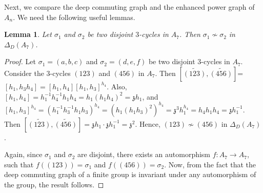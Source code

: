 \documentclass[12pt,a4paper]{article}
\newtheorem{lemma}[theorem]{Lemma}
\begin{document}
Next, we compare the deep commuting graph and the enhanced power graph of $A_n$. We need the following useful lemmas.
\begin{lemma}\label{3-cycle A_7}
Let $\sigma_1$ and $\sigma_2$ be two disjoint $3$-cycles in $A_7$. Then $\sigma_1\nsim\sigma_2$ in $\Delta_D(A_7)$.    
\end{lemma}
\begin{proof}
Let $\sigma_1=(a,b,c)$ and $\sigma_2=(d,e,f)$ be two disjoint $3$-cycles in $A_7$. Consider the $3$-cycles $(123)$ and $(456)$ in $A_7$. Then $[\tilde{(123)},\tilde{(456)}]$=$[h_1,h_3h_4]=[h_1,h_4][h_1,h_3]^{h_4}.$ Also, $[h_1,h_4]=h_1^{-1}h_4^{-1}h_1h_4=h_1(h_1h_4)^2=\mathfrak{z}h_1$, and $[h_1,h_3]^{h_4}=(h_1^{-1}h_3^{-1}h_1h_3)^{h_4}=(h_1(h_1h_3)^2)^{h_4}=\mathfrak{z}^3h_1^{h_4}=h_4h_1h_4=\mathfrak{z}h_1^{-1}.$ Then $[\tilde{(123)},\tilde{(456)}]=\mathfrak{z}h_1\cdot \mathfrak{z}h_1^{-1}=\mathfrak{z}^2$. Hence, $(123)\nsim (456)$ in $\Delta_D(A_7)$.

Again, since $\sigma_1$ and $\sigma_2$ are disjoint, there exists an automorphism $f:A_7\rightarrow A_7$, such that $f((123))=\sigma_1$ and $f((456))=\sigma_2$. Now, from the fact that the deep commuting graph of a finite group is invariant under any automorphism of the group, the result follows. 
\end{proof}
\end{document}
